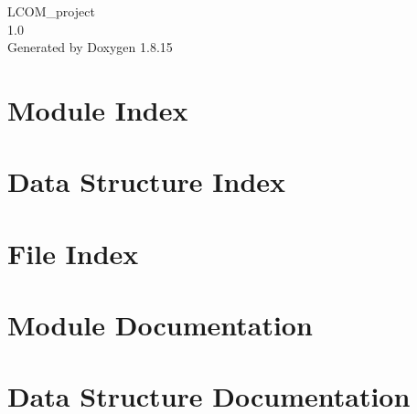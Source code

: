\let\mypdfximage\pdfximage\def\pdfximage{\immediate\mypdfximage}\documentclass[twoside]{book}
\newcommand{\+}{\discretionary{\mbox{\scriptsize$\hookleftarrow$}}{}{}}
\newcommand{\clearemptydoublepage}{%
  \newpage{\pagestyle{empty}\cleardoublepage}%
}
\begin{document}
\hypersetup{pageanchor=false,
             bookmarksnumbered=true,
             pdfencoding=unicode
            }
\begin{titlepage}
\vspace*{7cm}
\begin{center}%
{\Large L\+C\+O\+M\+\_\+project \\[1ex]\large 1.\+0 }\\
\vspace*{1cm}
{\large Generated by Doxygen 1.8.15}\\
\end{center}
\end{titlepage}
\clearemptydoublepage
{}
\tableofcontents
\clearemptydoublepage
{}
\hypersetup{pageanchor=true}

\chapter{Module Index}

\chapter{Data Structure Index}

\chapter{File Index}

\chapter{Module Documentation}















\chapter{Data Structure Documentation}







\end{document}
